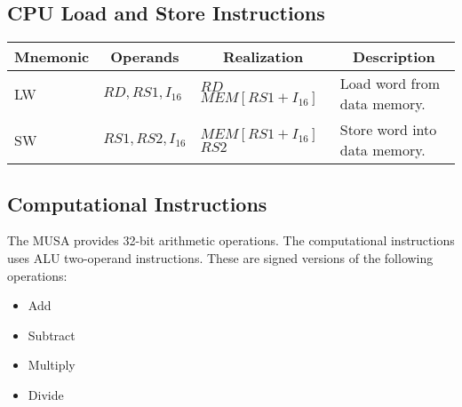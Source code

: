\documentclass{article}
\begin{document}
  \subsection{CPU Load and Store Instructions}
  
 \FloatBarrier
  \begin{table}[H]
    \begin{center}
      \label{tab:load_store_instructions}
      \begin{tabular}[pos]{| l | l | l | l |} \hline 	
      \multicolumn{1}{|c|}{\cellcolor[gray]{0.9}\textbf{Mnemonic}} &
      \multicolumn{1}{c|}{\cellcolor[gray]{0.9}\textbf{Operands}} &  
      \multicolumn{1}{c|}{\cellcolor[gray]{0.9}\textbf{Realization}} &
      \multicolumn{1}{c|}{\cellcolor[gray]{0.9}\textbf{Description}} \\ \hline
	LW  & $RD,RS1,I_{16}$ & $RD$ \textleftarrow $MEM[RS1+I_{16}]$ & Load word from data memory.	\\ \hline
	SW  & $RS1,RS2,I_{16}$ & $MEM[RS1+I_{16}]$ \textleftarrow $RS2$ & Store word into data memory. 		\\ \hline
      \end{tabular}
    \end{center}
  \end{table}  
  
  
  \subsection{Computational Instructions}
  
  The MUSA provides 32-bit arithmetic operations. The computational instructions uses ALU two-operand instructions. These are signed versions of the following operations:

  \begin{itemize}
   \item Add
   \item Subtract
   \item Multiply
   \item Divide
  \end{itemize}
  
\end{document}
